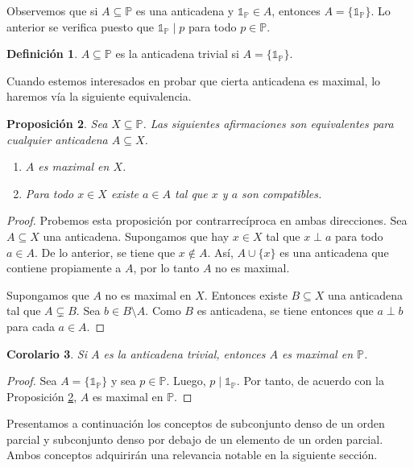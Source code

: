 \documentclass[11pt]{unam_tesis1}
\theoremstyle{MyThmStyle}
\theoremstyle{definition}
\newtheorem{definition}{Definici\'on}[chapter]
\theoremstyle{plain}
\newtheorem{proposition}[definition]{Proposici\'on}
\newtheorem{corollary}[definition]{Corolario}
\theoremstyle{remark}
\begin{document}
Observemos que si $A\subseteq \mathbb P$ es una anticadena y $\mathds 1_{\mathbb P} \in A$, entonces $A=\{\mathds 1_{\mathbb P} \}$. Lo anterior se verifica puesto que $\mathds 1_{\mathbb P}\mid p$ para todo $p\in \mathbb P$.

\begin{definition}
$A\subseteq \mathbb P$ es la anticadena trivial si $A=\{\mathds 1_{\mathbb P}\}$.
\end{definition}

Cuando estemos interesados en probar que cierta anticadena es maximal, lo haremos v\'ia la siguiente equivalencia.

\begin{proposition}\label{equivalencia}
Sea $X\subseteq \mathbb P$. Las siguientes afirmaciones son equivalentes para cualquier anticadena $A\subseteq X$.
  
  \begin{enumerate}
  \item $A$ es maximal en $X$.
  \item Para todo $x\in X$ existe $a\in A$ tal que $x$ y $a$ son compatibles.
  \end{enumerate}
\end{proposition}
\begin{proof}
Probemos esta proposici\'on por contrarrec\'iproca en ambas direcciones. Sea $A\subseteq X$ una anticadena. Supongamos que hay $x\in X$ tal que $x\perp a$ para todo $a\in A$. De lo anterior, se tiene que $x\notin A$. As\'i, $A\cup \{x\}$ es una anticadena que contiene propiamente a $A$, por lo tanto $A$ no es maximal.

Supongamos que $A$ no es maximal en $X$. Entonces existe $B\subseteq X$ una anticadena tal que $A\varsubsetneq B$. Sea $b\in B\setminus A$. Como $B$ es anticadena, se tiene entonces que $a\perp b$ para cada $a\in A$.
\end{proof}

\begin{corollary}
Si $A$ es la anticadena trivial, entonces $A$ es maximal en $\mathbb P$.
\end{corollary}

\begin{proof}
Sea $A=\{\mathds{1}_{\mathbb P} \}$ y sea $p\in \mathbb P$. Luego, $p\mid \mathds{1}_{\mathbb P}$. Por tanto, de acuerdo con la Proposici\'on \ref{equivalencia}, $A$ es maximal en $\mathbb P$.
\end{proof}

Presentamos a continuaci\'on los conceptos de subconjunto denso de un orden parcial y subconjunto denso por debajo de un elemento de un orden parcial. Ambos conceptos adquirir\'an una relevancia notable en la siguiente secci\'on.
\end{document}
